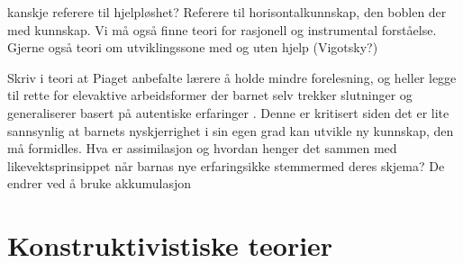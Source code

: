 \documentclass[12pt,a4paper]{article}
\begin{document}
\begin{tcolorbox}
    kanskje referere til hjelpløshet? Referere til horisontalkunnskap, den boblen der med kunnskap. Vi må også finne teori for rasjonell og instrumental forståelse. Gjerne også teori om utviklingssone med og uten hjelp (Vigotsky?)

    Skriv i teori at Piaget anbefalte lærere å holde mindre forelesning, og heller legge til rette for elevaktive arbeidsformer der barnet selv trekker slutninger og generaliserer basert på autentiske erfaringer \cite[p. 53]{skaalvik2021skolen}.
    Denne er kritisert siden det er lite sannsynlig at barnets nyskjerrighet i sin egen grad kan utvikle ny kunnskap, den må formidles. Hva er assimilasjon og hvordan henger det sammen med likevektsprinsippet når barnas nye erfaringsikke stemmermed
    deres skjema? De endrer ved å bruke akkumulasjon  
\end{tcolorbox}

\newpage
\section*{Konstruktivistiske teorier}%
\end{document}
